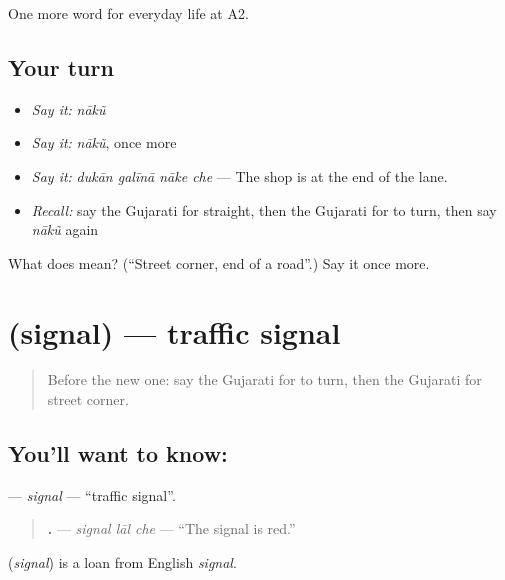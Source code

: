 \begin{grammarlens}[title={What you've built}]
One more word for everyday life at A2.
\end{grammarlens}

\subsection*{Your turn}
\begin{itemize}
\raggedright
  \item \emph{Say it:} \emph{nākũ}
  \item \emph{Say it:} \emph{nākũ}, once more
  \item \emph{Say it:} \emph{dukān galīnā nāke che} — The shop is at the end of the lane.
  \item \emph{Recall:} say the Gujarati for straight, then the Gujarati for to turn, then say \emph{nākũ} again
\end{itemize}

\begin{tcolorbox}[breakable,colback=teal!4,colframe=teal!35!black,title={Before you move on}]
What does  mean? (\textquotedblleft{}Street corner, end of a road\textquotedblright{}.) Say it once more.
\end{tcolorbox}
\section[\texorpdfstring{\gu{સિગ્નલ} (signal)}{સિગ્નલ (signal)}]{ (signal) — traffic signal}

\label{lesson:GU-C194-signal}



\begin{quote}
Before the new one: say the Gujarati for to turn, then the Gujarati for street corner.
\end{quote}

\subsection*{You'll want to know: }
\textbf{} — \emph{signal} — \textquotedblleft{}traffic signal\textquotedblright{}.

\begin{quote}
\textbf{  .} — \emph{signal lāl che} — \textquotedblleft{}The signal is red.\textquotedblright{}
\end{quote}

\begin{cousinweb}
\textbf{} (\emph{signal}) is a loan from English \emph{signal}.
\end{cousinweb}

